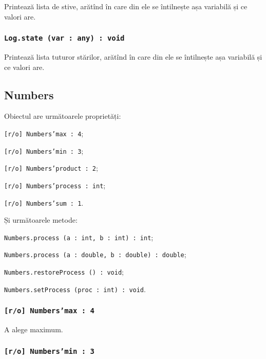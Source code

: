 Printează lista de stive, arătînd în care din ele se întilnește așa variabilă și ce valori are.

\subsubsection{\texttt{Log.state (var : any) : void}}

Printează lista tuturor stărilor, arătînd în care din ele se întilnește așa variabilă și ce valori are.

\subsection{{\color{orange} Numbers}}

Obiectul \numbers{} are următoarele proprietăți:
\begin{icItems}
	\item \texttt{[r/o] Numbers'max : 4};
	\item \texttt{[r/o] Numbers'min : 3};
	\item \texttt{[r/o] Numbers'product : 2};
	\item \texttt{[r/o] Numbers'process : int};
	\item \texttt{[r/o] Numbers'sum : 1}.
\end{icItems}

Și următoarele metode:
\begin{icItems}
	\item \texttt{Numbers.process (a : int, b : int) : int};
	\item \texttt{Numbers.process (a : double, b : double) : double};
	\item \texttt{Numbers.restoreProcess () : void};
	\item \texttt{Numbers.setProcess (proc : int) : void}.
\end{icItems}

\subsubsection{\texttt{[r/o] Numbers'max : 4}}

A alege maximum.

\subsubsection{\texttt{[r/o] Numbers'min : 3}}

